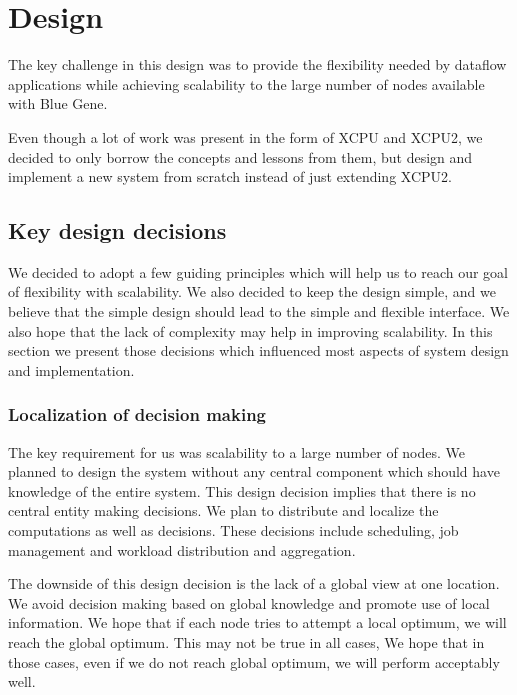\chapter{Design}
\label{chap:Design}

\ifpdf
    \graphicspath{{Chapter2/Chapter2Figs/PDF/}{Chapter2/Chapter2Figs/PNG/}
		{Chapter2/Chapter2Figs/}}
\else
    \graphicspath{{Chapter2/Chapter2Figs/EPS/}{Chapter2/Chapter2Figs/}}
\fi

The key challenge in this design was to provide the flexibility needed by dataflow
applications while achieving scalability to the large number of nodes available
with Blue Gene. 

Even though a lot of work was present in the form of XCPU and XCPU2, we 
decided to only borrow the concepts and lessons from them, but design and implement
a new system from scratch instead of just extending XCPU2.

\section{Key design decisions}

We decided to adopt a few guiding principles which will help us to reach our goal
of flexibility with scalability.  We also decided to keep the design simple,
and we believe that the simple design should lead to the simple and flexible interface.
We also hope that the lack of complexity may help in improving scalability.
In this section we present those decisions which influenced most aspects of
system design and implementation.

\subsection{Localization of decision making}
The key requirement for us was scalability to a large number of nodes.  We planned
to design the system without any central component which should have knowledge
of the entire system.  This design decision implies that there is no central entity 
making decisions.  We plan to distribute and localize the computations as well
as decisions.  These decisions include scheduling, job management and
workload distribution and aggregation.

The downside of this design decision is the lack of a global view at one location.
We avoid decision making based on global knowledge and promote use of local
information.  We hope that if each node tries to attempt a local optimum, we will
reach the global optimum.  This may not be true in all cases, We hope that in those cases, 
even if we do not reach global optimum, we will perform acceptably well.

